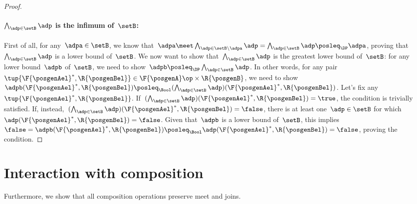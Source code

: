 \begin{proof}
    \paragraph*{$\bigwedge_{\adp \in \setB} \adp$ is the infimum of~$\setB$:}
    First of all, for any~$\adpa\in \setB$, we know that~$\adpa \meet \bigwedge_{\adp \in \setB \backslash \adpa} \adp= \bigwedge_{\adp \in \setB} \adp \posleq_\DP \adpa$, proving that~$\bigwedge_{\adp \in \setB} \adp$ is a lower bound of~$\setB$.
    We now want to show that~$\bigwedge_{\adp \in \setB} \adp$ is the greatest lower bound of~$\setB$: for any lower bound~$\adpb$ of~$\setB$, we need to show~$\adpb\posleq_\DP\bigwedge_{\adp \in \setB} \adp $.
    In other words, for any pair~$\tup{\F{\posgenAel}^*,\R{\posgenBel}}\in \F{\posgenA}\op\times \R{\posgenB}$, we need to show~$\adpb(\F{\posgenAel}^*,\R{\posgenBel}) \posleq_\Bool (\bigwedge_{\adp \in \setB} \adp)(\F{\posgenAel}^*,\R{\posgenBel})$.
    Let's fix any~$\tup{\F{\posgenAel}^*,\R{\posgenBel}}$. If~$(\bigwedge_{\adp \in \setB} \adp)(\F{\posgenAel}^*,\R{\posgenBel})=\true$, the condition is trivially satisfied.
    If, instead,~$(\bigwedge_{\adp \in \setB} \adp)(\F{\posgenAel}^*,\R{\posgenBel})=\false$, there is at least one~$\adp\in \setB$ for which~$\adp(\F{\posgenAel}^*,\R{\posgenBel})=\false$.
    Given that~$\adpb$ is a lower bound of~$\setB$, this implies~$\false=\adpb(\F{\posgenAel}^*,\R{\posgenBel})\posleq_\Bool \adp(\F{\posgenAel}^*,\R{\posgenBel})=\false$, proving the condition.
\end{proof}


\section{Interaction with composition}

Furthermore, we show that all composition operations preserve meet and joins.

